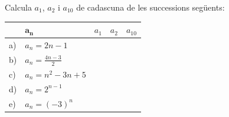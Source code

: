 \begin{extrapage}
\begin{mylist}
		\item Calcula $a_1$, $a_2$ i $a_{10}$ de cadascuna de les successions següents:
	\begin{center}
		\renewcommand{\arraystretch}{1.5}
		\begin{longtable}{|p{}|p{}|p{}|p{}|p{}|} \hline 
		\rowcolor{lightgray}	& $\mathbf{a_n}$ & $a_1$ & $a_2$ & $a_{10}$ \\ \hline
		\cellcolor{lightgray}	a) & $a_n = 2n-1$ &  &  &  \\ \hline
		\cellcolor{lightgray}	b) & $a_n = \frac{4n-3}{2}$ & & & \\ \hline
		\cellcolor{lightgray}	c) & $a_n = n^2 -3n+5$ & & & \\  \hline
		\cellcolor{lightgray}	d) & $a_n = 2^{n-1}$ & & & \\  \hline
		\cellcolor{lightgray}	e) & $a_n= (-3)^n$ & & & \\  \hline
		\end{longtable}	
	\end{center}	
\end{mylist}

\end{extrapage}	

\newpage

